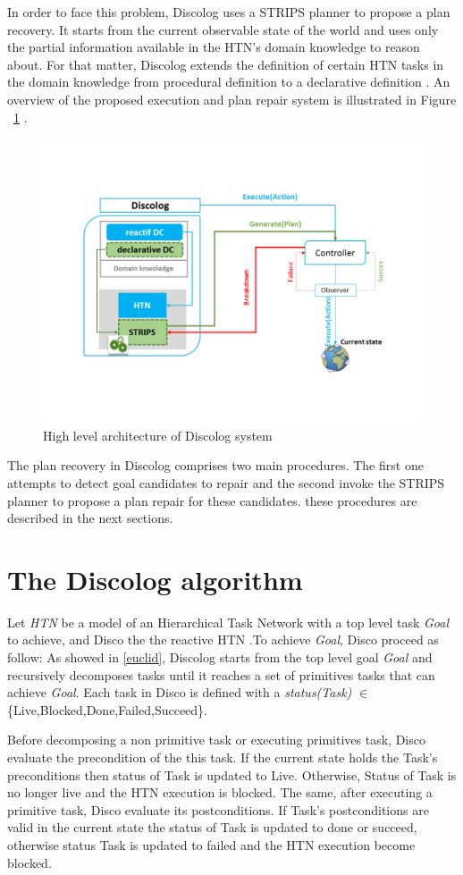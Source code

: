 In order to face this problem, Discolog uses a STRIPS planner to propose a plan recovery. It starts from the current observable state of the world and uses only the partial information available in the HTN's domain knowledge to reason about. For that matter, Discolog extends the definition of certain HTN tasks in the domain knowledge from procedural definition to a declarative definition . An overview of the proposed execution and plan repair system is illustrated in Figure ~\ref{High level description of Discolog system}  .
\begin{figure}[!h]
	\centering
	\includegraphics[width=\textwidth]{Pictures/architecture.png}
	\caption{\label{High level description of Discolog system} High level architecture of Discolog system}
\end{figure}


The plan recovery in Discolog comprises two main procedures. The first one attempts to detect goal candidates to repair and the second invoke the STRIPS planner to propose a plan repair for these candidates. these procedures are described in the next sections.
\section{The Discolog algorithm}
Let \textit{HTN} be a model of an Hierarchical Task Network with a top level task \textit{Goal} to achieve, and Disco the the reactive HTN .To achieve \textit{Goal},  Disco  proceed as follow:
As showed in \ref{euclid}, Discolog starts from the top level goal \textit{Goal} and recursively decomposes tasks until it reaches a set of primitives tasks that can achieve \textit{Goal}.
Each task in Disco is defined with a \textit{status(Task)} $\in$ \{Live,Blocked,Done,Failed,Succeed\}.
\par Before decomposing a non primitive task or executing primitives task, Disco evaluate the precondition of the this task. If the current state holds the  Task's preconditions  then status of Task is updated to Live. Otherwise, Status of Task is no longer live and the HTN execution is blocked.
The same, after executing a primitive task, Disco evaluate its postconditions. If Task's postconditions are valid in the current state the status of Task is updated to done or succeed, otherwise status Task is updated to failed and the HTN execution become blocked.


